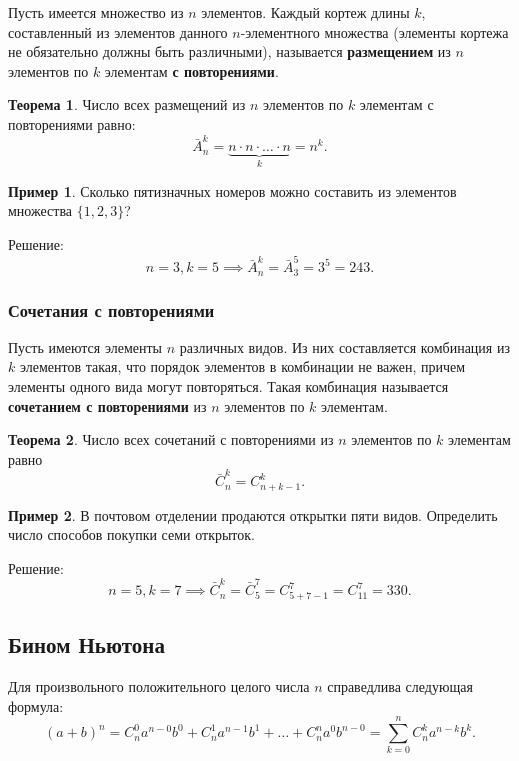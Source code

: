 \documentclass[a5paper, 11pt]{extarticle}
\theoremstyle{definition}
\newtheorem*{theorem*}{Теорема}
\newtheorem*{example*}{Пример}
\theoremstyle{definition}
\theoremstyle{definition}
\numberwithin{figure}{section}
\numberwithin{table}{section}
\begin{document}
Пусть имеется множество из \(n\) элементов. Каждый кортеж длины \(k\), составленный из элементов данного \(n\)-элементного множества (элементы кортежа не обязательно должны быть различными), называется \textbf{размещением} из \(n\) элементов по \(k\) элементам \textbf{с повторениями}.

\begin{theorem*}
    Число всех размещений из \(n\) элементов по \(k\) элементам с повторениями равно:
    \[
        \bar{A}_n^k = \underbrace{n \cdot n \cdot \ldots \cdot n}_k = n^k.
    \]
\end{theorem*}

\begin{example*}
    Сколько пятизначных номеров можно составить из элементов множества \(\{1, 2, 3\}\)?

    Решение:
    \[
        n = 3, k = 5
        \implies
        \bar{A}_n^k = \bar{A}_3^5 = 3^5 = 243.
    \]
\end{example*}

\subsubsection{Сочетания с повторениями}

Пусть имеются элементы \(n\) различных видов. Из них составляется комбинация из \(k\) элементов такая, что порядок элементов в комбинации не важен, причем элементы одного вида могут повторяться. Такая комбинация называется \textbf{сочетанием с повторениями} из \(n\) элементов по \(k\) элементам.

\begin{theorem*}
    Число всех сочетаний с повторениями из \(n\) элементов по \(k\) элементам равно
    \[
        \bar{C}_n^k = C_{n + k - 1}^k.
    \]
\end{theorem*}

\begin{example*}
    В почтовом отделении продаются открытки пяти видов. Определить число способов покупки семи открыток.

    Решение:
    \[
        n = 5, k = 7
        \implies
        \bar{C}_n^k = \bar{C}_5^7 = C_{5 + 7 - 1}^7 = C_{11}^7 = 330.
    \]
\end{example*}

\subsection{Бином Ньютона}

Для произвольного положительного целого числа \(n\) справедлива следующая формула:
\[
    (a + b)^n =
    C_n^0 a^{n - 0} b^0 + C_n^1 a^{n - 1} b^1 + \ldots + C_n^n a^0 b^{n - 0} =
    \sum_{k = 0}^n C_n^k a^{n - k} b^k.
\]
\end{document}
